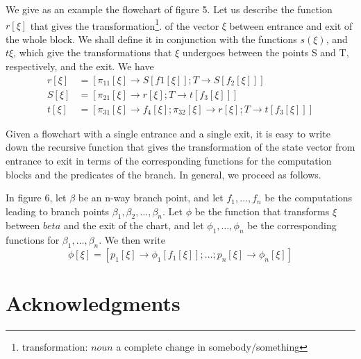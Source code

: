 \documentclass[11pt, a4paper]{article}
\begin{document}
We give as an example the flowchart of figure 5. Let us describe the function
$r[\xi]$ that gives the
transformation\footnote{transformation: $noun$ a complete change in
  somebody/something}.
of the vector $\xi$ between entrance and
exit of the whole block. We shall define it in conjunction with the functions
$s(\xi)$, and $t{\xi}$, which give the transformations that $\xi$ undergoes
between the points S and T, respectively, and the exit. We have
\begin{align*}
  r[\xi] &= [\pi_11[\xi] \to S[f1[\xi]]; T \to S[f_2[\xi]]] \\
  S[\xi] &= [\pi_21[\xi] \to r[\xi]; T \to t[f_3[\xi]]]     \\
  t[\xi] &= [\pi_31[\xi] \to f_4[\xi]; \pi_32[\xi] \to r[\xi]; T \to
    t[f_3[\xi]]]
\end{align*}

Given a flowchart with a single entrance and a single exit, it is easy to write
down the recursive function that gives the transformation of the state vector
from entrance to exit in terms of the corresponding functions for the
computation blocks and the predicates of the branch. In general, we proceed as
follows.

In figure 6, let $\beta$ be an n-way branch point, and let $f_1, \ldots, f_n$ be
the computations leading to branch points $\beta_1, \beta_2, \ldots,
\beta_n$. Let $\phi$ be the function that transforms $\xi$ between $beta$ and
the exit of the chart, and let $\phi_1, \ldots, \phi_n$ be the corresponding
functions for $\beta_1, \ldots, \beta_n$. We then write
$$ \phi[\xi] = [p_1[\xi] \to \phi_1[f_1[\xi]]; \ldots; p_n[\xi] \to
  \phi_n[\xi]] $$

\begin{figure}[h]
  \center
  \caption{}
\end{figure}

\section {Acknowledgments}
\end{document}
